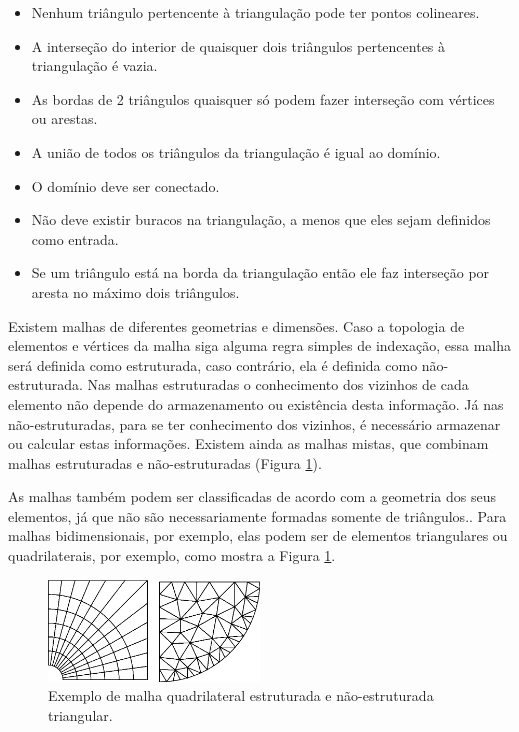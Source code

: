 \begin{itemize}
  \item Nenhum triângulo pertencente à triangulação pode ter pontos colineares.
  \item A interseção do interior de quaisquer dois triângulos pertencentes à triangulação é vazia.
  \item As bordas de 2 triângulos quaisquer só podem fazer interseção com vértices ou arestas.
  \item A união de todos os triângulos da triangulação é igual ao domínio.  
  \item O domínio deve ser conectado.
  \item Não deve existir buracos na triangulação, a menos que eles sejam definidos como entrada.
  \item Se um triângulo está na borda da triangulação então ele faz interseção por aresta no máximo dois triângulos.
\end{itemize}


Existem malhas de diferentes geometrias e dimensões. Caso a topologia de elementos e vértices da malha siga alguma regra simples de indexação, essa malha será definida como estruturada, caso contrário, ela é definida como não-estruturada. Nas malhas estruturadas o conhecimento dos vizinhos de cada elemento não depende do armazenamento ou existência desta informação. Já nas não-estruturadas, para se ter conhecimento dos vizinhos, é necessário armazenar ou calcular estas informações. Existem ainda as malhas mistas, que combinam malhas estruturadas e não-estruturadas (Figura \ref{fig:est_e_n_est}).

As malhas também podem ser classificadas de acordo com a geometria dos seus elementos, já que não são necessariamente formadas somente de triângulos.. Para malhas bidimensionais, por exemplo, elas podem ser de elementos triangulares ou quadrilaterais, por exemplo, como mostra a Figura \ref{fig:est_e_n_est}.

 \begin{figure}[htbp]
     \centering
     \includegraphics[width=0.5\textwidth]{fig/est_e_n_est.png}
     \caption{Exemplo de malha quadrilateral estruturada e não-estruturada triangular.} 
     \label{fig:est_e_n_est}
 \end{figure}
 
